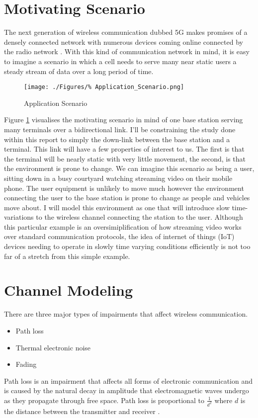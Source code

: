\section{Motivating Scenario}
\label{sec:MotivatingScenario}
The next generation of wireless communication %
dubbed 5G makes promises of a densely connected %
network with numerous devices coming online %
connected by the radio network \cite{Demestichas13,Hossain15}. %
With this kind of communication network in mind, it is easy %
to imagine a scenario in which a cell needs %
to serve many near static users a steady stream %
of data over a long period of time.%
\begin{figure}[ht]
	\texttt{[image: ./Figures/\%
	Application\_Scenario.png]}
	\caption{Application Scenario}
	\label{fig:AppScene}
\end{figure}
Figure \ref{fig:AppScene} visualises the motivating %
scenario in mind of one base station serving many %
terminals over a bidirectional link. I'll be constraining %
the study done within this report to simply the down-link %
between the base station and a terminal. This link will %
have a few properties of interest to us. The first is that %
the terminal will be nearly static with very little movement, %
the second, is that the environment is prone to change. We can %
imagine this scenario as being a user, sitting down in a busy %
courtyard watching streaming video on their mobile phone. The %
user equipment is unlikely to move much however the environment %
connecting the user to the base station is prone to change as %
people and vehicles move about. I will model this environment %
as one that will introduce slow time-variations to the wireless %
channel connecting the station to the user. Although this %
particular example is an oversimiplification of how streaming %
video works over standard communication protocols, the idea %
of internet of things (IoT) devices needing to operate in %
slowly time varying conditions efficiently is not too far %
of a stretch from this simple example.

\section{Channel Modeling}

There are three major types of impairments that affect %
wireless communication.
\begin{itemize}
	\item{Path loss}
	\item{Thermal electronic noise}
	\item{Fading}
\end{itemize}
Path loss is an impairment that affects %
all forms of electronic communication and is %
caused by the natural decay in amplitude %
that electromagnetic waves undergo as they %
propagate through free space. Path loss %
is proportional to $\frac{1}{d^2}$ where %
$d$ is the distance between the transmitter %
and receiver \cite{Sklar01}.

